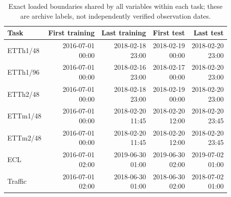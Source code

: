 \begin{table}[!htbp]
\centering
\caption{Exact loaded boundaries shared by all variables within each task; these are archive labels, not independently verified observation dates.}
\label{tab:boundaries}
\small
\setlength{\tabcolsep}{3.5pt}
\begin{tabular}{lrrrr}
\hline
Task & First training & Last training & First test & Last test \\
\hline
ETTh1/48 & \shortstack{2016-07-01\\00:00} & \shortstack{2018-02-18\\23:00} & \shortstack{2018-02-19\\00:00} & \shortstack{2018-02-20\\23:00} \\
ETTh1/96 & \shortstack{2016-07-01\\00:00} & \shortstack{2018-02-16\\23:00} & \shortstack{2018-02-17\\00:00} & \shortstack{2018-02-20\\23:00} \\
ETTh2/48 & \shortstack{2016-07-01\\00:00} & \shortstack{2018-02-18\\23:00} & \shortstack{2018-02-19\\00:00} & \shortstack{2018-02-20\\23:00} \\
ETTm1/48 & \shortstack{2016-07-01\\00:00} & \shortstack{2018-02-20\\11:45} & \shortstack{2018-02-20\\12:00} & \shortstack{2018-02-20\\23:45} \\
ETTm2/48 & \shortstack{2016-07-01\\00:00} & \shortstack{2018-02-20\\11:45} & \shortstack{2018-02-20\\12:00} & \shortstack{2018-02-20\\23:45} \\
ECL & \shortstack{2016-07-01\\02:00} & \shortstack{2019-06-30\\01:00} & \shortstack{2019-06-30\\02:00} & \shortstack{2019-07-02\\01:00} \\
Traffic & \shortstack{2016-07-01\\02:00} & \shortstack{2018-06-30\\01:00} & \shortstack{2018-06-30\\02:00} & \shortstack{2018-07-02\\01:00} \\

\end{tabular}
\end{table}
